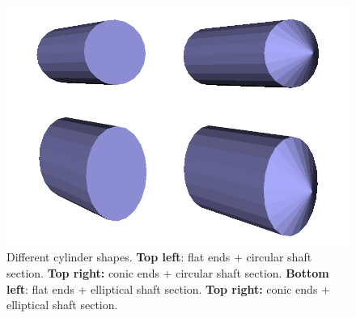 \begin{figure}
  \centering
  \includegraphics[scale=0.5]{images/09/create_3D_primitives/conic_non_conic.png} 
	\caption{Different cylinder shapes. \textbf{Top left}: flat ends + circular shaft section. \textbf{Top right:} conic ends + circular shaft section. \textbf{Bottom left}: flat ends + elliptical shaft section. \textbf{Top right:} conic ends + elliptical shaft section.}
 \label{conic_non_conic}
\end{figure}

